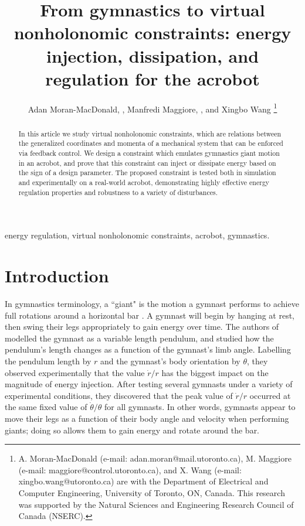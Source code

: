 \documentclass[journal,twoside,web, twocolumn]{ieeecolor}
\newcommand*{\Title}{From gymnastics to virtual nonholonomic constraints: energy
injection, dissipation, and regulation for the acrobot}
\begin{document}
\title{\Title}
\author{Adan Moran-MacDonald, , Manfredi Maggiore,
, and Xingbo Wang
\thanks{A. Moran-MacDonald (e-mail: adan.moran@mail.utoronto.ca),
M. Maggiore (e-mail: maggiore@control.utoronto.ca), and
X. Wang (e-mail: xingbo.wang@utoronto.ca) are with the Department of
Electrical and Computer Engineering, University of Toronto, ON, Canada. This research was supported by the Natural Sciences and Engineering Research Council of Canada (NSERC).}
} %

\maketitle

\begin{abstract}
    In this article we study virtual nonholonomic constraints, which are
    relations between the generalized coordinates and momenta of a
    mechanical system that can be enforced via feedback control.
    We design a constraint which emulates gymnastics giant motion in an
    acrobot, and prove that this constraint can inject or dissipate
    energy based on the sign of a design parameter.
    The proposed constraint is tested both in simulation and experimentally on a real-world acrobot,
    demonstrating highly effective energy regulation properties and robustness
    to a variety of disturbances.
\end{abstract}

\begin{IEEEkeywords}
    energy regulation, virtual nonholonomic constraints, acrobot, gymnastics.
\end{IEEEkeywords}

\section{Introduction}\label{sec:introduction}

In gymnastics terminology, a ``giant" is the motion a gymnast performs to
achieve full rotations around a horizontal bar \cite{usagym_giant}. 
A gymnast will begin by hanging at rest, then swing their legs
appropriately to gain energy over time.
The authors of \cite{pendulum_length_giant_gymnastics} modelled the gymnast as a
variable length pendulum, and studied how the pendulum's length changes as a
function of the gymnast's limb angle.
Labelling the pendulum length by \(r\) and the gymnast's body orientation
by \(\theta\), they observed experimentally that the value \(\dot{r}/r\) has
the biggest impact on the magnitude of energy injection. 
After testing several gymnasts under a variety of experimental conditions, 
they discovered that the peak value of \(\dot{r}/r\) occurred at the same fixed
value of \(\dot{\theta}/\theta\) for all gymnasts.
In other words, gymnasts appear to move their legs as a function of their body
angle and velocity when performing giants; 
doing so allows them to gain energy and rotate around the bar.
\end{document}
